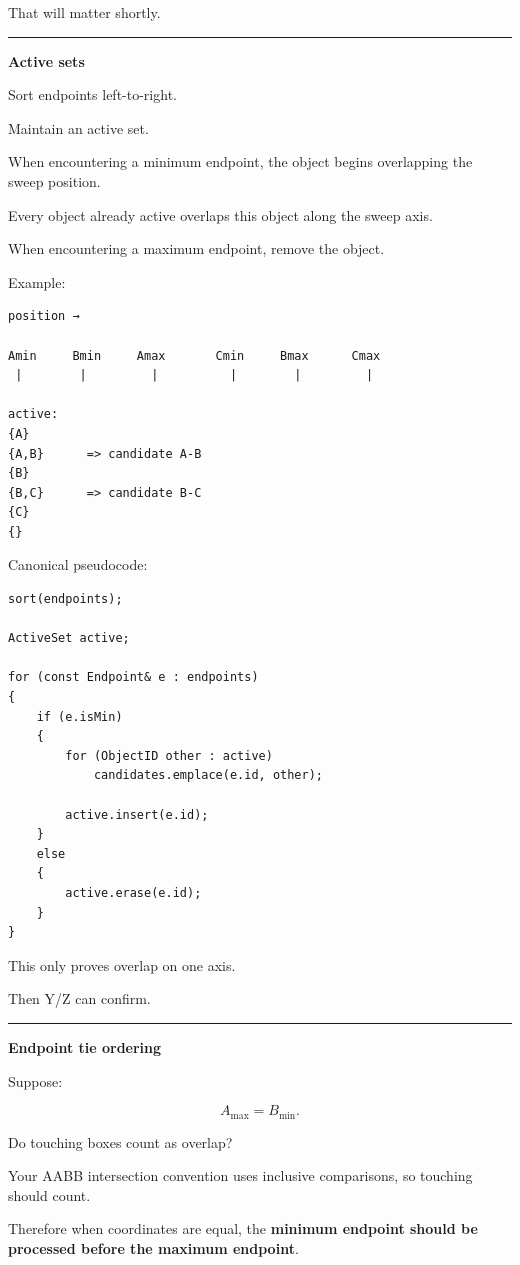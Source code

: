 That will matter shortly.

\begin{center}\rule{0.5\linewidth}{0.5pt}\end{center}

\textbf{Active sets}

Sort endpoints left-to-right.

Maintain an active set.

When encountering a minimum endpoint, the object begins overlapping the sweep position.

Every object already active overlaps this object along the sweep axis.

When encountering a maximum endpoint, remove the object.

Example:

\begin{verbatim}
position →

Amin     Bmin     Amax       Cmin     Bmax      Cmax
 |        |         |          |        |         |

active:
{A}
{A,B}      => candidate A-B
{B}
{B,C}      => candidate B-C
{C}
{}
\end{verbatim}

Canonical pseudocode:

\begin{verbatim}
sort(endpoints);

ActiveSet active;

for (const Endpoint& e : endpoints)
{
    if (e.isMin)
    {
        for (ObjectID other : active)
            candidates.emplace(e.id, other);

        active.insert(e.id);
    }
    else
    {
        active.erase(e.id);
    }
}
\end{verbatim}

This only proves overlap on one axis.

Then Y/Z can confirm.

\begin{center}\rule{0.5\linewidth}{0.5pt}\end{center}

\textbf{Endpoint tie ordering}

Suppose:

\[
A_{\max}=B_{\min}.
\]

Do touching boxes count as overlap?

Your AABB intersection convention uses inclusive comparisons, so touching should count.

Therefore when coordinates are equal, the \textbf{minimum endpoint should be processed before the maximum endpoint}.

